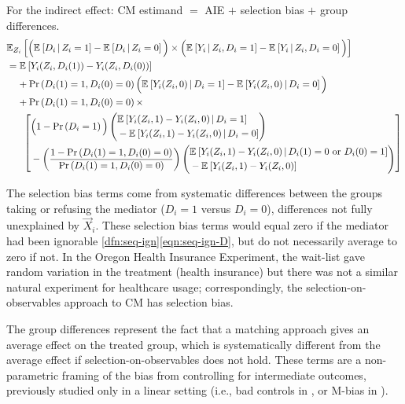 \noindent
For the indirect effect: CM estimand $=$ AIE $+$ selection bias $+$ group differences.
\begin{align*}
    &\E[Z_i]{
        \Big( \Egiven{D_i}{Z_i = 1} - \Egiven{D_i}{Z_i = 0} \Big) \times
        \Big( \Egiven{Y_i}{Z_i, D_i = 1} - \Egiven{Y_i}{Z_i, D_i = 0} \Big) } \\
    & = \E{Y_i(Z_i, D_i(1)) - Y_i(Z_i, D_i(0))} \\
    & \;\;\;\; + \Prob{D_i(1) = 1, D_i(0) = 0} \Big(
        \Egiven{Y_i(Z_i, 0)}{D_i = 1} - \Egiven{Y_i(Z_i, 0)}{D_i = 0} \Big) \\
    & \;\;\;\; + \Prob{D_i(1) = 1, D_i(0) = 0} \times \\
    & \;\;\;\; \;\; \left[ \begin{aligned}
        &\Big( 1 - \Prob{D_i=1} \Big)
        \left( \begin{aligned}
            &\Egiven{Y_i(Z_i, 1) - Y_i(Z_i, 0)}{D_i = 1} \\ 
            &  - \Egiven{Y_i(Z_i, 1) - Y_i(Z_i, 0)}{D_i = 0}
        \end{aligned} \right) \\
        &- \left( \frac{1 - \Prob{D_i(1) = 1, D_i(0) = 0} }{
            \Prob{D_i(1) = 1, D_i(0) = 0}} \right)
        \left( \begin{aligned}
            &\Egiven{Y_i(Z_i, 1) - Y_i(Z_i, 0)}{D_i(1) = 0 \text{ or } D_i(0)=1} \\ 
            &  - \E{Y_i(Z_i, 1) - Y_i(Z_i, 0)}
        \end{aligned} \right)
    \end{aligned} \right]
\end{align*}

The selection bias terms come from systematic differences between the groups taking or refusing the mediator ($D_i = 1$ versus $D_i = 0$), differences not fully unexplained by $\vec X_i$.
These selection bias terms would equal zero if the mediator had been ignorable \ref{dfn:seq-ign}\eqref{eqn:seq-ign-D}, but do not necessarily average to zero if not.
In the Oregon Health Insurance Experiment, the wait-list gave random variation in the treatment (health insurance) but there was not a similar natural experiment for healthcare usage; correspondingly, the selection-on-observables approach to CM has selection bias.

The group differences represent the fact that a matching approach gives an average effect on the treated group, which is systematically different from the average effect if selection-on-observables does not hold.
These terms are a non-parametric framing of the bias from controlling for intermediate outcomes, previously studied only in a linear setting (i.e., bad controls in \citealt{cinelli2024crash}, or M-bias in \citealt{ding2015adjust}).

